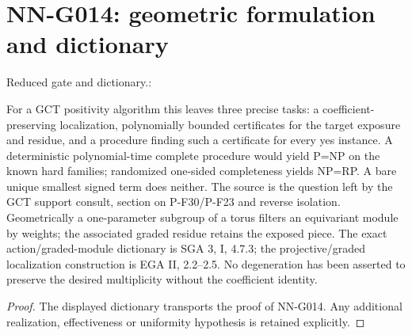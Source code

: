 \section{NN-G014: geometric formulation and dictionary}
\begin{geometricstatement}[NN-G014]
Reduced gate and dictionary.:

For a GCT positivity algorithm this leaves three precise
tasks: a coefficient-preserving localization, polynomially
bounded certificates for the target exposure and residue,
and a procedure finding such a certificate for every yes
instance. A deterministic polynomial-time complete procedure
would yield P=NP on the known hard families; randomized
one-sided completeness yields NP=RP. A bare unique smallest
signed term does neither. The source is the question left
by the GCT support consult, section on P-F30/P-F23 and
reverse isolation. Geometrically a one-parameter subgroup
of a torus filters an equivariant module by weights; the
associated graded residue retains the exposed piece. The
exact action/graded-module dictionary is SGA 3, I, 4.7.3;
the projective/graded localization construction is EGA II,
2.2--2.5. No degeneration has been asserted to preserve
the desired multiplicity without the coefficient identity.


\end{geometricstatement}
\begin{proof} The displayed dictionary transports the proof of NN-G014. Any additional realization, effectiveness or uniformity hypothesis is retained explicitly.\end{proof}


